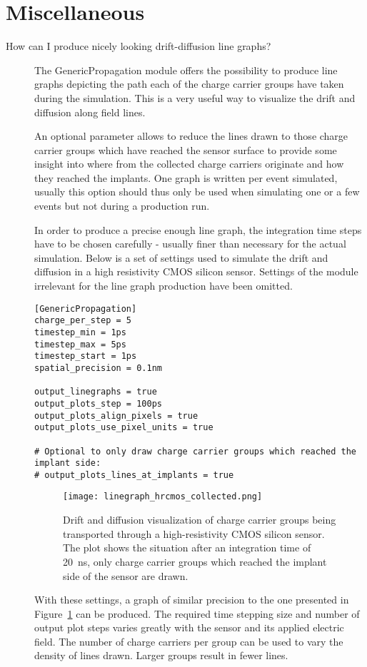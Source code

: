 \section{Miscellaneous}
\begin{description}
\item[How can I produce nicely looking drift-diffusion line graphs?]
The GenericPropagation module offers the possibility to produce line graphs depicting the path each of the charge carrier groups have taken during the simulation. This is a very useful way to visualize the drift and diffusion along field lines.

An optional parameter allows to reduce the lines drawn to those charge carrier groups which have reached the sensor surface to provide some insight into where from the collected charge carriers originate and how they reached the implants.
One graph is written per event simulated, usually this option should thus only be used when simulating one or a few events but not during a production run.

In order to produce a precise enough line graph, the integration time steps have to be chosen carefully - usually finer than necessary for the actual simulation. Below is a set of settings used to simulate the drift and diffusion in a high resistivity CMOS silicon sensor.
Settings of the module irrelevant for the line graph production have been omitted.

\begin{verbatim}
[GenericPropagation]
charge_per_step = 5
timestep_min = 1ps
timestep_max = 5ps
timestep_start = 1ps
spatial_precision = 0.1nm

output_linegraphs = true
output_plots_step = 100ps
output_plots_align_pixels = true
output_plots_use_pixel_units = true

# Optional to only draw charge carrier groups which reached the implant side:
# output_plots_lines_at_implants = true
\end{verbatim}

\begin{figure}[tbp]
    \centering
  \texttt{[image: linegraph\_hrcmos\_collected.png]}
  \caption{Drift and diffusion visualization of charge carrier groups being transported through a high-resistivity CMOS silicon sensor. The plot shows the situation after an integration time of \SI{20}{\nano \second}, only charge carrier groups which reached the implant side of the sensor are drawn.}
  \label{fig:linegraph}
\end{figure}

With these settings, a graph of similar precision to the one presented in Figure~\ref{fig:linegraph} can be produced.
The required time stepping size and number of output plot steps varies greatly with the sensor and its applied electric field.
The number of charge carriers per group can be used to vary the density of lines drawn. Larger groups result in fewer lines.
\end{description}

